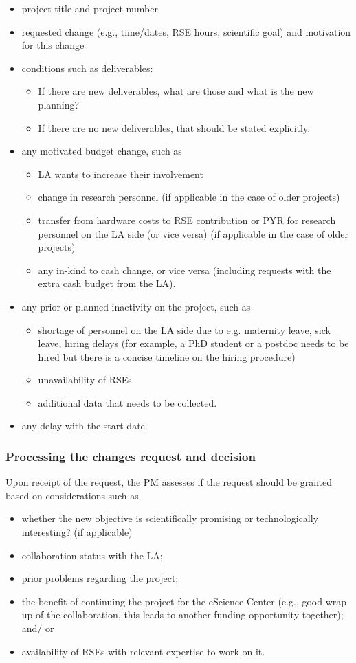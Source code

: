 \begin{itemize}
\item project title and project number
\item requested change (e.g., time/dates, RSE hours, scientific goal) and motivation for this change
\item conditions such as deliverables: 
\begin{itemize}
\item If there are new deliverables, what are those and what is the new planning? 
\item If there are no new deliverables, that should be stated explicitly.
\end{itemize}
\item any motivated budget change, such as 
\begin{itemize}
\item LA wants to increase their involvement 
\item change in research personnel (if applicable in the case of older projects)
\item transfer from hardware costs to RSE contribution or PYR for research personnel on the LA side (or vice versa) (if
applicable in the case of older projects)
\item any in-kind to cash change, or vice versa (including requests with the extra cash budget from the LA).
\end{itemize}
\item any prior or planned inactivity on the project, such as
\begin{itemize}
\item shortage of personnel on the LA side due to e.g. maternity leave, sick leave, hiring delays (for example, a PhD student
or a postdoc needs to be hired but there is a concise timeline on the hiring procedure)
\item unavailability of RSEs 
\item additional data that needs to be collected.
\end{itemize}
\item any delay with the start date.
\end{itemize}


\subsubsection{Processing the changes request and decision}
Upon receipt of the request, the PM assesses if the request should be granted based on considerations such as 
\begin{itemize}
\item whether the new objective is scientifically promising or technologically interesting? (if applicable)
\item collaboration status with the LA;
\item prior problems regarding the project;
\item the benefit of continuing the project for the eScience Center (e.g., good wrap up of the collaboration, this leads to
another funding opportunity together); and/ or
\item availability of RSEs with relevant expertise to work on it.
\end{itemize}

